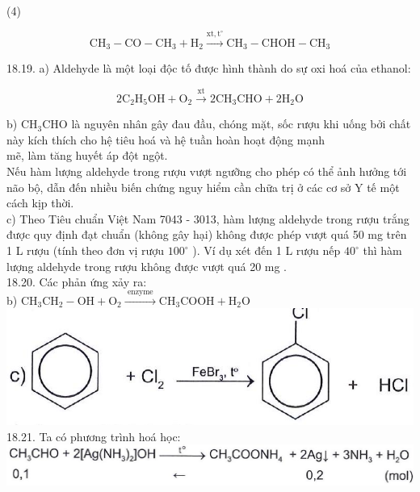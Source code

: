 \documentclass[10pt]{article}
\begin{document}
(4)

$$
\mathrm{CH}_{3}-\mathrm{CO}-\mathrm{CH}_{3}+\mathrm{H}_{2} \xrightarrow{\mathrm{xt}, \mathrm{t}^{\circ}} \mathrm{CH}_{3}-\mathrm{CHOH}-\mathrm{CH}_{3}
$$

18.19. a) Aldehyde là một loại độc tố được hình thành do sự oxi hoá của ethanol:

$$
2 \mathrm{C}_{2} \mathrm{H}_{5} \mathrm{OH}+\mathrm{O}_{2} \xrightarrow{\mathrm{xt}} 2 \mathrm{CH}_{3} \mathrm{CHO}+2 \mathrm{H}_{2} \mathrm{O}
$$

b) $\mathrm{CH}_{3} \mathrm{CHO}$ là nguyên nhân gây đau đầu, chóng mặt, sốc rượu khi uống bởi chất này kích thích cho hệ tiêu hoá và hệ tuần hoàn hoạt động mạnh\\
mẽ, làm tăng huyết áp đột ngột.\\
Nếu hàm lượng aldehyde trong rượu vượt ngưỡng cho phép có thể ảnh hưởng tới não bộ, dẫn đến nhiều biến chứng nguy hiểm cần chữa trị ở các cơ sở Y tế một cách kịp thời.\\
c) Theo Tiêu chuẩn Việt Nam 7043 - 3013, hàm lượng aldehyde trong rượu trắng được quy định đạt chuẩn (không gây hại) không được phép vượt quá 50 mg trên 1 L rượu (tính theo đơn vị rượu $100^{\circ}$ ). Ví dụ xét đến 1 L rượu nếp $40^{\circ}$ thì hàm lượng aldehyde trong rượu không được vượt quá 20 mg .\\
18.20. Các phản ứng xảy ra:\\
b) $\mathrm{CH}_{3} \mathrm{CH}_{2}-\mathrm{OH}+\mathrm{O}_{2} \xrightarrow{\text { enzyme }} \mathrm{CH}_{3} \mathrm{COOH}+\mathrm{H}_{2} \mathrm{O}$\\
\includegraphics[max width=\textwidth, center]{2025_10_23_adad5b98d65ac6665838g-39}\\
18.21. Ta có phương trình hoá học:\\
\includegraphics[max width=\textwidth, center]{2025_10_23_adad5b98d65ac6665838g-39(1)}
\end{document}
